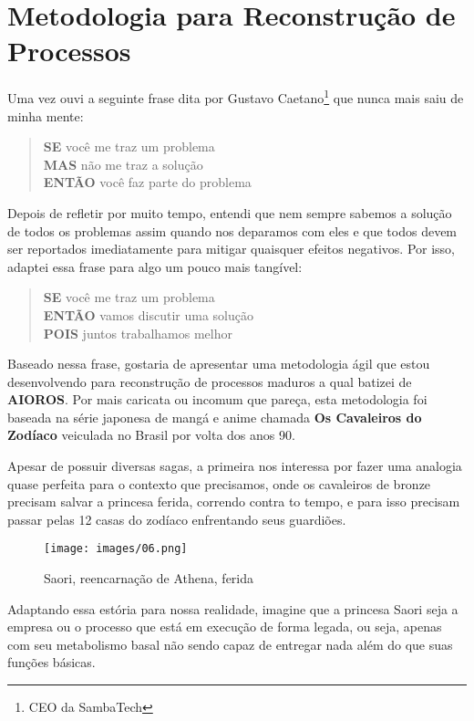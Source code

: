 
\section{Metodologia para Reconstrução de Processos}

Uma vez ouvi a seguinte frase dita por Gustavo Caetano\footnote{CEO da SambaTech} que nunca mais saiu de minha mente:
\begin{quote}
    \textbf{SE} você me traz um problema \\
    \textbf{MAS} não me traz a solução \\
    \textbf{ENTÃO} você faz parte do problema
\end{quote}

Depois de refletir por muito tempo, entendi que nem sempre sabemos a solução de todos os problemas assim quando nos deparamos com eles e que  todos devem ser reportados imediatamente para mitigar quaisquer efeitos negativos. Por isso, adaptei essa frase para algo um pouco mais tangível:
\begin{quote}
    \textbf{SE} você me traz um problema \\
    \textbf{ENTÃO} vamos discutir uma solução \\
    \textbf{POIS} juntos trabalhamos melhor
\end{quote}

Baseado nessa frase, gostaria de apresentar uma metodologia ágil que estou desenvolvendo para reconstrução de processos maduros a qual batizei de \textbf{AIOROS}. Por mais caricata ou incomum que pareça, esta metodologia foi baseada na série japonesa de mangá e anime chamada \textbf{Os Cavaleiros do Zodíaco} veiculada no Brasil por volta dos anos 90.

Apesar de possuir diversas sagas, a primeira nos interessa por fazer uma analogia quase perfeita para o contexto que precisamos, onde os cavaleiros de bronze precisam salvar a princesa ferida, correndo contra to tempo, e para isso precisam passar pelas 12 casas do zodíaco enfrentando seus guardiões.

\begin{figure}[H]
    \centering
    \texttt{[image: images/06.png]}
    \caption{Saori, reencarnação de Athena, ferida}
\end{figure}

Adaptando essa estória para nossa realidade, imagine que a princesa Saori seja a empresa ou o processo que está em execução de forma legada, ou seja, apenas com seu metabolismo basal não sendo capaz de entregar nada além do que suas funções básicas.


